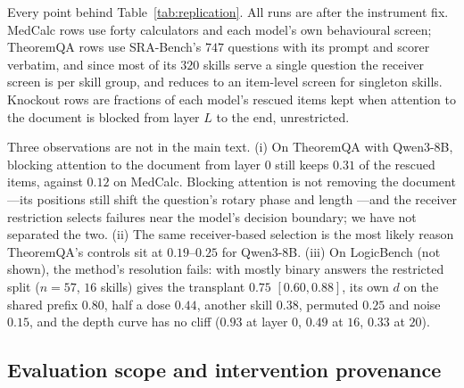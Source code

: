 \documentclass{article}
\newcommand{\dvec}{\ensuremath{d}}
\begin{document}
Every point behind Table~\ref{tab:replication}. All runs are after the
instrument fix. MedCalc rows use forty calculators and each model's own
behavioural screen; TheoremQA rows use SRA-Bench's $747$ questions with its
prompt and scorer verbatim, and since most of its $320$ skills serve a single
question the receiver screen is per skill group, and reduces to an item-level screen for singleton skills. Knockout rows are fractions of each
model's rescued items kept when attention to the document is blocked from layer
$L$ to the end, unrestricted.

\begin{table}[h]
\caption{The replication curves. Battery, sufficiency and rank are $\rho$
(Eq.~\ref{eq:rho}) on the restricted split; necessity is the fraction of rescued
items kept. ``Another family'' (MedCalc) and ``another skill'' (TheoremQA) are
the transfer controls available in each set.}
\label{tab:replicationfull}
\centering
\scriptsize
\setlength{\tabcolsep}{3pt}

\end{table}

Three observations are not in the main text. (i) On TheoremQA with Qwen3-8B,
blocking attention to the document from layer $0$ still keeps $0.31$ of the
rescued items, against $0.12$ on MedCalc. Blocking attention is not removing
the document---its positions still shift the question's rotary phase and length
---and the receiver restriction selects failures near the model's decision
boundary; we have not separated the two. (ii) The same receiver-based selection is the
most likely reason TheoremQA's controls sit at $0.19$--$0.25$ for Qwen3-8B. (iii)
On LogicBench (not shown), the method's resolution fails: with mostly binary
answers the restricted split ($n=57$, $16$ skills) gives the transplant $0.75$
$[0.60, 0.88]$, its own $\dvec$ on the shared prefix $0.80$, half a dose $0.44$, another skill
$0.38$, permuted $0.25$ and noise $0.15$, and the depth curve has no cliff
($0.93$ at layer $0$, $0.49$ at $16$, $0.33$ at $20$).

\subsection{Evaluation scope and intervention provenance}
\label{app:limits}
\end{document}

